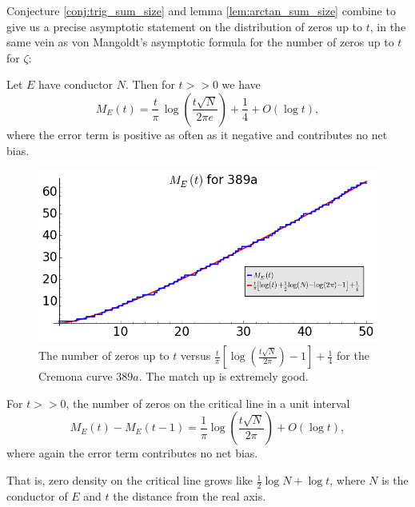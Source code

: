 \documentclass[10pt]{article}
\begin{document}
Conjecture \ref{conj:trig_sum_size} and lemma \ref{lem:arctan_sum_size} combine to give us a precise asymptotic statement on the distribution of zeros up to $t$, in the same vein as von Mangoldt's asymptotic formula for the number of zeros up to $t$ for $\zeta$:

\begin{theorem}[S.]\label{thm:zero_density}
Let $E$ have conductor $N$. Then for $t>>0$ we have
\begin{equation}\label{eqn:zero_density}
M_E(t) = \frac{t}{\pi} \, \log\left(\frac{t\sqrt{N}}{2\pi e}\right) + \frac{1}{4} + O(\log t),
\end{equation}
where the error term is positive as often as it negative and contributes no net bias.
\end{theorem}

\begin{figure}[!h]
    \centering
    \includegraphics[width=1.0\textwidth]{graphics/M_E_389.png}
    \caption{The number of zeros up to $t$ versus $\frac{t}{\pi}\left[\log\left(\frac{t\sqrt{N}}{2\pi}\right) -1 \right] + \frac{1}{4}$ for the Cremona curve $389a$. The match up is extremely good.}
    \label{fig:M_E_389}
\end{figure}

\begin{corollary}
For $t>>0$, the number of zeros on the critical line in a unit interval
\begin{equation}
M_E(t)-M_E(t-1) = \frac{1}{\pi}\log\left(\frac{t\sqrt{N}}{2\pi}\right) + O(\log t),
\end{equation}
where again the error term contributes no net bias.
\end{corollary}

That is, zero density on the critical line grows like $\frac{1}{2}\log N + \log t$, where $N$ is the conductor of $E$ and $t$ the distance from the real axis. \\
\end{document}
